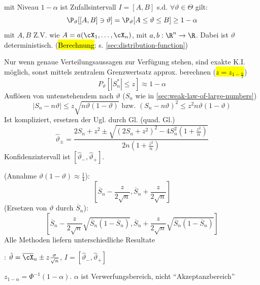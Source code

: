 \shortdefinition[Konfidenzintervall (K.I.)] mit Niveau $1 - \alpha$ ist Zufallsintervall $I = [A, B]$ s.d. $\forall \vartheta \in \Theta$ gilt:
\[
    \P_\vartheta[[A, B] \ni \vartheta] = \P_\vartheta[A \leq \vartheta \leq B] \geq 1 - \alpha
\]
mit $A, B$ Z.V. wie $A = a(\cX_1, \ldots, \cX_n)$, mit $a, b: \R^n \rightarrow \R$.
Dabei ist $\vartheta$ deterministisch. (\hl{Berechnung}: s. \ref{sec:distribution-function})

\shortremark[Approx. K.I.] Nur wenn genaue Verteilungsaussagen zur Verfügung stehen, sind exakte K.I. möglich,
sonst mittels zentralem Grenzwertsatz approx. berechnen (\hl{$z = z_{1 - \frac{\alpha}{2}}$})
\[
    P_\vartheta[|S_n^*| \leq z] \approx 1 - \alpha
\]
Auflösen von untenstehendem nach $\vartheta$ ($S_n$ wie in \ref{sec:weak-law-of-large-numbers})
\[
    |S_n - n \vartheta| \leq z \sqrt{n \vartheta(1 - \vartheta)} \text{ bzw. } (S_n - n \vartheta)^2 \leq z^2 n \vartheta(1 - \vartheta)
\]
Ist kompliziert, ersetzen der Ugl. durch Gl. (quad. Gl.)
\[
    \hat{\vartheta}_\pm = \frac{2 S_n + z^2 \pm \sqrt{(2 S_n + z^2)^2 - 4S_n^2(1 + \frac{z^2}{n})}}{2n(1 + \frac{z^2}{n})}
\]
Konfidenzintervall ist $[\hat{\vartheta}_-, \hat{\vartheta}_+]$.

 (Annahme $\vartheta(1 - \vartheta) \approx \frac{1}{4}$):
\[
    \left[\overline{S}_n - \frac{z}{2 \sqrt{n}}, \overline{S}_n + \frac{z}{2 \sqrt{n}}\right]
\]
(Ersetzen von $\vartheta$ durch $\overline{S}_n$):
\[
    \left[ \overline{S}_n - \frac{z}{2 \sqrt{n}} \sqrt{\overline{S}_n (1 - \overline{S}_n)}, \overline{S}_n + \frac{z}{2 \sqrt{n}} \sqrt{\overline{S}_n (1 - \overline{S}_n)} \right]
\]
Alle Methoden liefern unterschiedliche Resultate

: $\hat{\vartheta} = \overline{\cX}_n \pm z \frac{\sigma}{\sqrt{n}}$, $I = [\hat{\vartheta}_-, \hat{\vartheta}_+]$

\shortdefinition $z_{1 - \alpha} = \Phi^{-1}(1 - \alpha)$. $\alpha$ ist Verwerfungsbereich, nicht ``Akzeptanzbereich''

